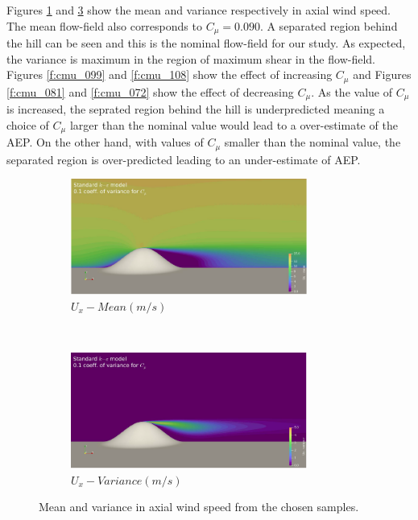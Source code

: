 \documentclass[]{aiaa-tc}%
\begin{document}
Figures \ref{f:cmu_mean} and \ref{f:cmu_var} show the mean and variance respectively in axial wind speed. The mean flow-field also corresponds to $C_{\mu} = 0.090$. A separated region behind the hill can be seen and this is the nominal flow-field for our study. As expected, the variance is maximum in the region of maximum shear in the flow-field. Figures \ref{f:cmu_099} and \ref{f:cmu_108} show the effect of increasing $C_{\mu}$ and Figures \ref{f:cmu_081} and \ref{f:cmu_072} show the effect of decreasing $C_{\mu}$. As the value of  $C_{\mu}$ is increased, the seprated region behind the hill is underpredicted meaning a choice of $C_{\mu}$ larger than the nominal value would lead to a over-estimate of the AEP. On the other hand, with values of $C_{\mu}$ smaller than the nominal value, the separated region is over-predicted leading to an under-estimate of AEP.

\begin{figure}[t!]
    \centering
    \begin{subfigure}[t]{0.5\textwidth}
        \centering
        \includegraphics[height=1.5in]{Ux_Mean.png}
        \caption{$U_x - Mean (m/s)$}
        \label{f:cmu_mean}
    \end{subfigure}%
    ~ 
    \begin{subfigure}[t]{0.5\textwidth}
        \centering
        \includegraphics[height=1.5in]{Ux_Variance.png}
        \caption{$U_x - Variance (m/s)$}
	\label{f:cmu_var}
    \end{subfigure}
    \caption{Mean and variance in axial wind speed from the chosen samples.}
\end{figure}
\end{document}
